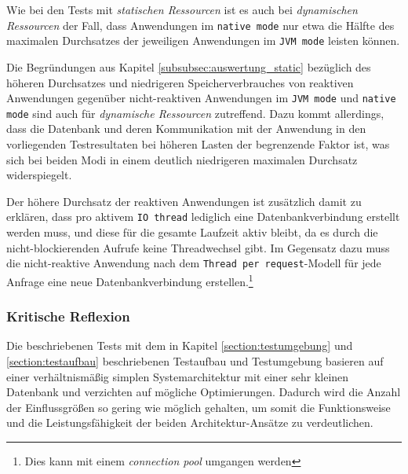 Wie bei den Tests mit \textit{statischen Ressourcen} ist es auch bei \textit{dynamischen Ressourcen} der Fall, dass Anwendungen im
\verb|native mode| nur etwa die Hälfte des maximalen Durchsatzes der jeweiligen Anwendungen im \verb|JVM mode| leisten können.

Die Begründungen aus Kapitel \ref{subsubsec:auswertung_static} bezüglich des höheren Durchsatzes und niedrigeren Speicherverbrauches
von reaktiven Anwendungen gegenüber nicht-reaktiven Anwendungen im \verb|JVM mode| und \verb|native mode| sind auch für
\textit{dynamische Ressourcen} zutreffend.
Dazu kommt allerdings, dass die Datenbank und deren Kommunikation mit der Anwendung in den vorliegenden Testresultaten
bei höheren Lasten der begrenzende Faktor ist, was sich bei beiden Modi in einem deutlich niedrigeren maximalen Durchsatz widerspiegelt.

Der höhere Durchsatz der reaktiven Anwendungen ist zusätzlich damit zu erklären, dass pro aktivem \verb|IO thread| lediglich eine
Datenbankverbindung erstellt werden muss, und diese für die gesamte Laufzeit aktiv bleibt, da es durch die nicht-blockierenden
Aufrufe keine Threadwechsel gibt. Im Gegensatz dazu muss die nicht-reaktive Anwendung nach dem \verb|Thread per request|-Modell
für jede Anfrage eine neue Datenbankverbindung erstellen.\footnote{Dies kann mit einem \textit{connection pool} umgangen werden}

\subsubsection{Kritische Reflexion}
\label{subsubsec:auswertung_kritische_reflexion}
Die beschriebenen Tests mit dem in Kapitel \ref{section:testumgebung} und \ref{section:testaufbau} beschriebenen Testaufbau und Testumgebung
basieren auf einer verhältnismäßig simplen Systemarchitektur mit einer sehr kleinen Datenbank und verzichten auf mögliche Optimierungen.
Dadurch wird die Anzahl der Einflussgrößen so gering wie möglich gehalten, um somit die Funktionsweise und die
Leistungsfähigkeit der beiden Architektur-Ansätze zu verdeutlichen.

